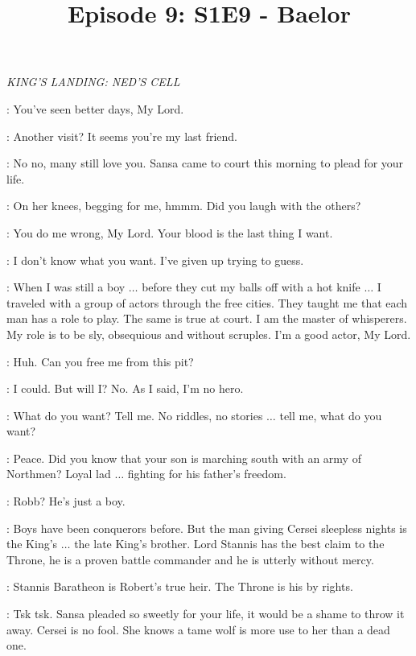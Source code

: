 

\title{Episode 9: S1E9 - Baelor}
\author{}
\date{}
\maketitle




\scene

\textit{KING'S LANDING: NED'S CELL} 


\VARYS: You've seen better days, My Lord. 

\NED: Another visit? It seems you're my last friend. 

\VARYS: No no, many still love you. Sansa came to court this morning to plead for your life. 

\NED: On her knees, begging for me, hmmm. Did you laugh with the others? 

\VARYS: You do me wrong, My Lord. Your blood is the last thing I want. 

\NED: I don't know what you want. I've given up trying to guess. 

\VARYS: When I was still a boy $\ldots$ before they cut my balls off with a hot knife $\ldots$  I traveled with a group of actors through the free cities. They taught me that each man has a role to play. The same is true at court. I am the master of whisperers. My role is to be sly, obsequious and without scruples. I'm a good actor, My Lord. 

\NED: Huh. Can you free me from this pit? 

\VARYS: I could. But will I? No. As I said, I'm no hero. 

\NED: What do you want? Tell me. No riddles, no stories $\ldots$ tell me, what do you want? 

\VARYS: Peace. Did you know that your son is marching south with an army of Northmen? Loyal lad $\ldots$ fighting for his father's freedom. 

\NED: Robb? He's just a boy. 

\VARYS: Boys have been conquerors before. But the man giving Cersei sleepless nights is the King's $\ldots$ the late King's brother. Lord Stannis has the best claim to the Throne, he is a proven battle commander and he is utterly without mercy. 

\NED: Stannis Baratheon is Robert's true heir. The Throne is his by rights. 

\VARYS: Tsk tsk. Sansa pleaded so sweetly for your life, it would be a shame to throw it away. Cersei is no fool. She knows a tame wolf is more use to her than a dead one. 

